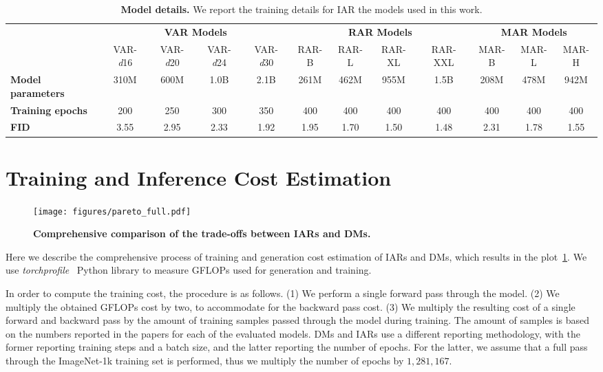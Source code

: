 \begin{table*}[h!]
    \centering
        \newcommand{\tightcolsep}{\setlength{\tabcolsep}{2pt}} %
    \tightcolsep %
    \caption{\textbf{Model details.} We report the training details for IAR the models used in this work.}
    \label{tab:iar_model_details}
        \tiny
    \begin{tabular}{l c c c c c c c c c c c}
        \toprule
        & \multicolumn{4}{c}{\textbf{VAR Models}} & \multicolumn{4}{c}{\textbf{RAR Models}} & \multicolumn{3}{c}{\textbf{MAR Models}} \\
        \cmidrule(r){2-5} \cmidrule(r){6-9} \cmidrule(r){10-12}
        & VAR-\textit{d}16 & VAR-\textit{d}20 & VAR-\textit{d}24 & VAR-\textit{d}30 & RAR-B & RAR-L & RAR-XL & RAR-XXL & MAR-B & MAR-L & MAR-H \\
        \midrule
        \textbf{Model parameters} & 310M & 600M  &  1.0B & 2.1B & 261M & 462M & 955M & 1.5B & 208M & 478M & 942M \\
        \textbf{Training epochs} & 200  & 250  & 300  & 350 & 400 & 400 & 400 & 400 & 400 & 400 &  400 \\
        \textbf{FID} & 3.55  & 2.95  & 2.33  & 1.92 & 1.95 & 1.70 & 1.50 & 1.48 & 2.31 & 1.78 & 1.55 \\
        \bottomrule
    \end{tabular}
\end{table*}


\section{Training and Inference Cost Estimation}
\label{app:pareto_how}
\begin{figure}[h]
    \centering
    \texttt{[image: figures/pareto\_full.pdf]}
    \caption{\textbf{Comprehensive comparison of the trade-offs between IARs and DMs.}}
    \label{fig:pareto_app}
\end{figure}

Here we describe the comprehensive process of training and generation cost estimation of IARs and DMs, which results in the plot~\cref{fig:pareto_app}. We use \textit{torchprofile}~\citep{torchprofile} Python library to measure GFLOPs used for generation and training. 

In order to compute the training cost, the procedure is as follows. (1) We perform a single forward pass through the model. (2) We multiply the obtained GFLOPs cost by two, to accommodate for the backward pass cost. (3) We multiply the resulting cost of a single forward and backward pass by the amount of training samples passed through the model during training. The amount of samples is based on the numbers reported in the papers for each of the evaluated models. DMs and IARs use a different reporting methodology, with the former reporting training steps and a batch size, and the latter reporting the number of epochs. For the latter, we assume that a full pass through the ImageNet-1k training set is performed, thus we multiply the number of epochs by $1,281,167$.

